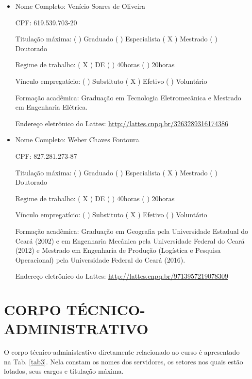 \documentclass{paper}
\def\web#1{\href{#1}{#1}}
\begin{document}
\begin{itemize}
 Formação acadêmica: Graduação em Engenharia Mecânica, Mestrado em Ciências e Engenharia dos Materiais e Doutorado em Engenharia e Ciência de Materiais

 Endereço eletrônico do Lattes: \web{http://lattes.cnpq.br/0209565051697344}


\item Nome Completo: Venício Soares de Oliveira

 CPF: 619.539.703-20

 Titulação máxima: (  ) Graduado  (  ) Especialista  ( X ) Mestrado (  ) Doutorado

 Regime de trabalho: ( X ) DE  (  ) 40horas (  ) 20horas

 Vínculo empregatício: (  ) Substituto  ( X ) Efetivo  (  ) Voluntário

 Formação acadêmica: Graduação em Tecnologia Eletromecânica e Mestrado em Engenharia Elétrica.

 Endereço eletrônico do Lattes: \web{http://lattes.cnpq.br/3263289316174386}
 
 \item Nome Completo: Weber Chaves Fontoura

 CPF: 827.281.273-87

 Titulação máxima: (  ) Graduado  (  ) Especialista  ( X ) Mestrado (  ) Doutorado

 Regime de trabalho: ( X ) DE  (  ) 40horas (  ) 20horas

 Vínculo empregatício: (  ) Substituto  ( X ) Efetivo  (  ) Voluntário

 Formação acadêmica: Graduação em Geografia pela Universidade Estadual do Ceará (2002) e em Engenharia Mecânica pela Universidade Federal do Ceará (2012) e Mestrado em Engenharia de Produção (Logística e Pesquisa Operacional) pela Universidade Federal do Ceará (2016).

 Endereço eletrônico do Lattes: \web{http://lattes.cnpq.br/9713957219078309}

\end{itemize}


\clearpage
\section{CORPO TÉCNICO-ADMINISTRATIVO}

O corpo técnico-administrativo diretamente relacionado ao curso é apresentado na Tab. \ref{tab3}. Nela constam os nomes dos servidores, os setores nos quais estão lotados, seus cargos e titulação máxima.
\end{document}
